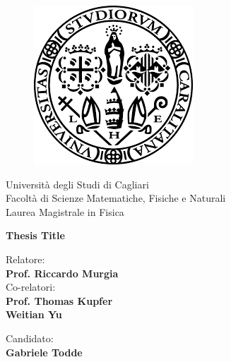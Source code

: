 \begin{titlepage}
\begin{figure}[!htb]
    \centering
    \includegraphics[keepaspectratio=true,scale=0.5]{images/Frontespizio/download.png}
\end{figure}

\begin{center}
    \LARGE{Università degli Studi di Cagliari}
    \vspace{5mm}
    \\ \large{Facoltà di Scienze Matematiche, Fisiche e Naturali}
    \vspace{5mm}
    \\ \LARGE{Laurea Magistrale in Fisica}
\end{center}

\vspace{15mm}
\begin{center}
    {\LARGE{\bf Thesis Title}}
    
    
\end{center}
\vspace{30mm}

\begin{minipage}[t]{0.47\textwidth}
	{\large{Relatore:}{\normalsize\vspace{3mm}
	\\ 
        \large{\textbf{Prof. Riccardo Murgia}}\vspace{3mm} \\
        {\large{Co-relatori:}{\normalsize\vspace{3mm}
 	\bf\\ 
        \large{Prof. Thomas Kupfer\vspace{1mm}\\
                     Weitian Yu}
    \normalsize\vspace{3mm}\bf}}}}\\ 
\end{minipage}
\hfill
\begin{minipage}[t]{0.47\textwidth}\raggedleft
	{\large{Candidato:}{\normalsize\vspace{3mm} \bf\\ \large{Gabriele Todde}}}
\end{minipage}

\vspace{30mm}
\hrulefill
\\

\end{titlepage}
